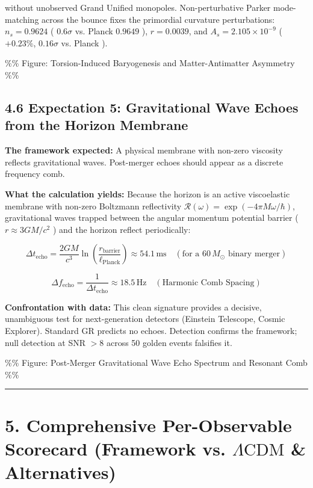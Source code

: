 \documentclass[11pt,a4paper]{article}
\theoremstyle{definition}\newtheorem{definition}{Definition}
\theoremstyle{remark}\newtheorem{remark}{Remark}
\begin{document}
without unobserved Grand Unified monopoles. Non-perturbative Parker mode-matching across the bounce fixes the primordial curvature perturbations: $n_s = 0.9624$ ( $0.6\sigma$ vs. Planck $0.9649$ ), $r = 0.0039$, and $A_s = 2.105 \times 10^{-9}$ ( $+0.23\%$, $0.16\sigma$ vs. Planck ).

\%\% Figure: Torsion-Induced Baryogenesis and Matter-Antimatter Asymmetry \%\%
\subsection{4.6 Expectation 5: Gravitational Wave Echoes from the Horizon Membrane}

\textbf{The framework expected:} A physical membrane with non-zero viscosity reflects gravitational waves. Post-merger echoes should appear as a discrete frequency comb.

\textbf{What the calculation yields:} Because the horizon is an active viscoelastic membrane with non-zero Boltzmann reflectivity $\mathcal{R}(\omega) = \exp(-4\pi M \omega / \hbar)$, gravitational waves trapped between the angular momentum potential barrier ( $r \approx 3 G M/c^2$ ) and the horizon reflect periodically:


\begin{equation}
\boxed{\Delta t_{\text{echo}} = \frac{2 G M}{c^3} \ln\left( \frac{r_{\text{barrier}}}{\ell_{\text{Planck}}} \right) \approx 54.1 \, \mathrm{ms} \quad (\text{for a } 60 \, M_\odot \text{ binary merger})}
\end{equation}



\begin{equation}
\boxed{\Delta f_{\text{echo}} = \frac{1}{\Delta t_{\text{echo}}} \approx 18.5 \, \mathrm{Hz} \quad (\text{Harmonic Comb Spacing})}
\end{equation}


\textbf{Confrontation with data:} This clean signature provides a decisive, unambiguous test for next-generation detectors (Einstein Telescope, Cosmic Explorer). Standard GR predicts no echoes. Detection confirms the framework; null detection at SNR $> 8$ across 50 golden events falsifies it.

\%\% Figure: Post-Merger Gravitational Wave Echo Spectrum and Resonant Comb \%\%

\noindent\rule{\linewidth}{0.4pt}
\section{5. Comprehensive Per-Observable Scorecard (Framework vs. $\Lambda\text{CDM}$ \& Alternatives)}
\end{document}
